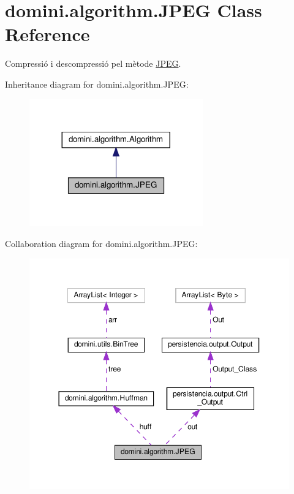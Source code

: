\hypertarget{classdomini_1_1algorithm_1_1JPEG}{}\section{domini.\+algorithm.\+J\+P\+EG Class Reference}
\label{classdomini_1_1algorithm_1_1JPEG}


Compressió i descompressió pel mètode \hyperlink{classdomini_1_1algorithm_1_1JPEG}{J\+P\+EG}.  




Inheritance diagram for domini.\+algorithm.\+J\+P\+EG\+:\nopagebreak
\begin{figure}[H]
\begin{center}
\leavevmode
\includegraphics[width=212pt]{classdomini_1_1algorithm_1_1JPEG__inherit__graph}
\end{center}
\end{figure}


Collaboration diagram for domini.\+algorithm.\+J\+P\+EG\+:\nopagebreak
\begin{figure}[H]
\begin{center}
\leavevmode
\includegraphics[width=350pt]{classdomini_1_1algorithm_1_1JPEG__coll__graph}
\end{center}
\end{figure}
